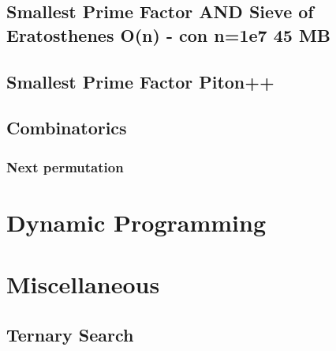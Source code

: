 \subsection{Smallest Prime Factor AND Sieve of Eratosthenes O(n) - con n=1e7 45 MB}
\raggedbottom
\hrulefill
\subsection{Smallest Prime Factor Piton++}
\raggedbottom
\hrulefill
\subsection{Combinatorics}
\subsubsection{Next permutation}
\raggedbottom
\hrulefill
\section{Dynamic Programming}
\section{Miscellaneous}
\subsection{Ternary Search}
\hrulefill

